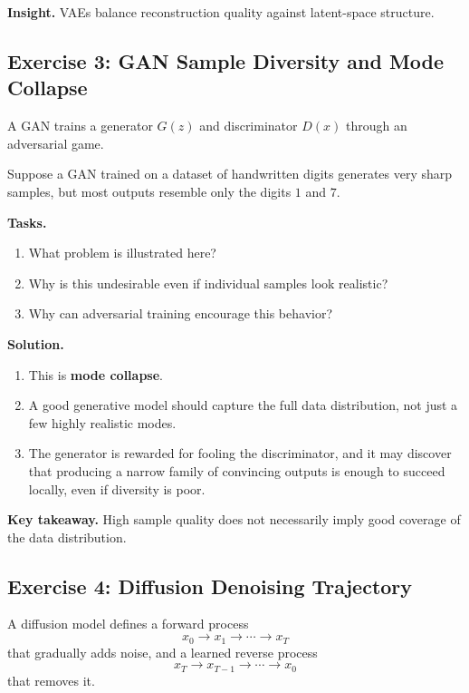 \medskip

\noindent
\textbf{Insight.}  
VAEs balance reconstruction quality against latent-space structure.

\subsection{Exercise 3: GAN Sample Diversity and Mode Collapse}

A GAN trains a generator \(G(z)\) and discriminator \(D(x)\) through an adversarial game.

Suppose a GAN trained on a dataset of handwritten digits generates very sharp samples, but most outputs resemble only the digits \(1\) and \(7\).

\medskip

\noindent
\textbf{Tasks.}
\begin{enumerate}
    \item What problem is illustrated here?
    \item Why is this undesirable even if individual samples look realistic?
    \item Why can adversarial training encourage this behavior?
\end{enumerate}

\medskip

\noindent
\textbf{Solution.}
\begin{enumerate}
    \item This is \textbf{mode collapse}.

    \item A good generative model should capture the full data distribution, not just a few highly realistic modes.

    \item The generator is rewarded for fooling the discriminator, and it may discover that producing a narrow family of convincing outputs is enough to succeed locally, even if diversity is poor.
\end{enumerate}

\medskip

\noindent
\textbf{Key takeaway.}  
High sample quality does not necessarily imply good coverage of the data distribution.

\subsection{Exercise 4: Diffusion Denoising Trajectory}

A diffusion model defines a forward process
\[
x_0 \to x_1 \to \cdots \to x_T
\]
that gradually adds noise, and a learned reverse process
\[
x_T \to x_{T-1} \to \cdots \to x_0
\]
that removes it.

